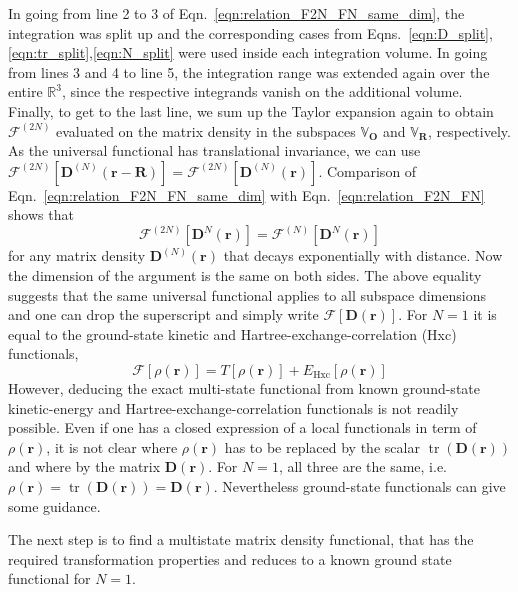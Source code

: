\documentclass[journal=jpclcd,manuscript=letter]{achemso}
\DeclareMathOperator{\tr}{tr}
\newcommand\m[1]{\mathbf{#1}}
\renewcommand\vec[1]{\mathbf{#1}}
\begin{document}
In going from line 2 to 3 of Eqn.~\ref{eqn:relation_F2N_FN_same_dim}, the integration was split up and the corresponding cases from Eqns.~\ref{eqn:D_split},\ref{eqn:tr_split},\ref{eqn:N_split} were used inside each integration volume. In going from lines 3 and 4 to line 5, the integration range was extended again over the entire $\mathbb{R}^3$, since the respective integrands vanish on the additional volume. Finally, to get to the last line, we sum up the Taylor expansion again to obtain $\mathcal{F}^{(2N)}$ evaluated on the matrix density in the subspaces $\mathbb{V}_{\vec{O}}$ and $\mathbb{V}_{\vec{R}}$, respectively. As the universal functional has translational invariance, we can use $\mathcal{F}^{(2N)}[\m{D}^{(N)}(\vec{r}-\vec{R})] = \mathcal{F}^{(2N)}[\m{D}^{(N)}(\vec{r})]$.
Comparison of Eqn.~\ref{eqn:relation_F2N_FN_same_dim} with Eqn.~\ref{eqn:relation_F2N_FN} shows that
\begin{equation}
 \mathcal{F}^{(2N)}[\m{D}^{N}(\vec{r})] = \mathcal{F}^{(N)}[\m{D}^{N}(\vec{r})]
\end{equation}
for any matrix density $\m{D}^{(N)}(\vec{r})$ that decays exponentially with distance.
Now the dimension of the argument is the same on both sides. The above equality suggests that the same universal functional applies to all subspace dimensions and one can drop the superscript and simply write $\mathcal{F}[\m{D}(\vec{r})]$. For $N=1$ it is equal to the ground-state kinetic and Hartree-exchange-correlation (Hxc) functionals,
\begin{equation}
 \mathcal{F}[\rho(\vec{r})] = T[\rho(\vec{r})] + E_{\text{Hxc}}[\rho(\vec{r})]
\end{equation}
However, deducing the exact multi-state functional from known ground-state kinetic-energy and Hartree-exchange-correlation functionals is not readily possible.
Even if one has a closed expression of a local functionals in term of $\rho(\vec{r})$,
it is not clear where $\rho(\vec{r})$ has to be replaced by the scalar $\tr(\m{D}(\vec{r}))$
and where by the matrix $\m{D}(\vec{r})$.
For $N=1$, all three are the same, i.e. $\rho(\vec{r}) = \tr(\m{D}(\vec{r})) = \m{D}(\vec{r})$.
Nevertheless ground-state functionals can give some guidance.

The next step is to find a multistate matrix density functional, that has the required transformation properties
 and reduces to a known ground state functional for $N=1$.
\end{document}
